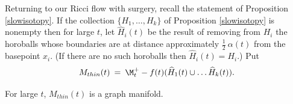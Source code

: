 Returning to our Ricci flow with surgery, recall the statement of
Proposition \ref{slowisotopy}. If the collection
$\{H_1,\ldots, H_k\}$ of Proposition \ref{slowisotopy} is nonempty then
for large $t$, let $\widehat{H}_i(t)$ be the result of removing from $H_i$ the horoballs whose
boundaries are at
distance approximately $\frac12 \: \alpha(t)$ from the basepoint $x_i$.
(If there are no such horoballs then $\widehat{H}_i(t) = H_i$.)
Put
\begin{equation}
M_{thin}(t) \: = \: \M_t^+ - f(t) (\widehat{H}_1(t) \cup \ldots \widehat{H}_k(t)).
\end{equation}

\begin{proposition}
  \label{prop:kl-thin-part-graph-manifold-thick-thin-geometry-proposition}
 \label{thingraph}
For large $t$, $M_{thin}(t)$ is a graph manifold.
\end{proposition}
